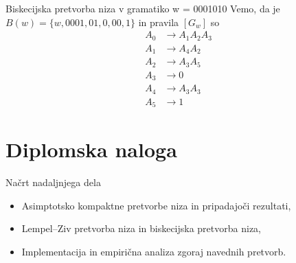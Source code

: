 \documentclass{beamer}
\theoremstyle{definition}
\begin{document}
\begin{frame}
    \begin{exampleblock}{Biskecijska pretvorba niza v gramatiko w = 0001010}
        Vemo, da je $ B(w) = \{ w, 0001, 01, 0, 00, 1 \} $
        in pravila $ [G_{w}] $ so
        \begin{align*}
            A_0 &\rightarrow A_1 A_2 A_3 \tag{1} \\
            A_1 &\rightarrow A_4 A_2 \tag{2}\\
            A_2 &\rightarrow A_3 A_5 \tag{4}\\
            A_3 &\rightarrow 0 \tag{5} \\
            A_4 &\rightarrow A_3 A_3 \tag{3} \\
            A_5 &\rightarrow 1 \tag{6}
        \end{align*}
    \end{exampleblock}
\end{frame}

\section{Diplomska naloga}

\begin{frame}{Načrt nadaljnjega dela}
    \begin{itemize}
        \item Asimptotsko kompaktne pretvorbe niza in pripadajoči rezultati,
        \item Lempel–Ziv pretvorba niza in biskecijska pretvorba niza,
        \item Implementacija in empirična analiza zgoraj navednih pretvorb.
    \end{itemize}
\end{frame}
\end{document}
